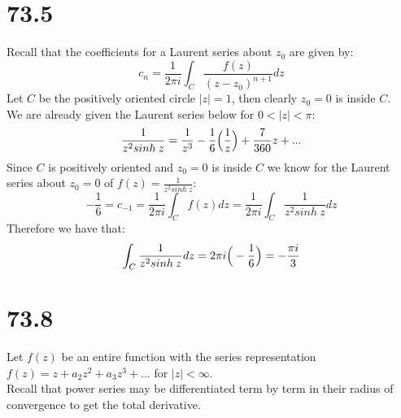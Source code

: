 \documentclass{article}
\begin{document}
\newpage
\section*{73.5}
\begin{center}
    \doublespacing
    Recall that the coefficients for a Laurent series about $z_0$ are given by:
    \[c_n =\frac{1}{2\pi i}\int _{C}\frac{f(z)}{(z - z_0)^{n+1}} dz\]
    Let $C$ be the positively oriented circle $|z| = 1$, then clearly $z_0 = 0$ is inside $C$.
    \\We are already given the Laurent series below for $0 < |z| <\pi$:
    \[\frac{1}{z^2 sinh\:z} =\frac{1}{z^3} -\frac{1}{6}\Big{(}\frac{1}{z}\Big{)} +\frac{7}{360} z + ...\]
    Since $C$ is positively oriented and $z_0 = 0$ is inside $C$ we know for the Laurent series about $z_0 = 0$ of $f(z) =\frac{1}{z^2 sinh\:z}$:
    \[-\frac{1}{6} = c_{-1} =\frac{1}{2\pi i}\int _{C} f(z) dz =\frac{1}{2\pi i}\int _{C}\frac{1}{z^2 sinh\:z} dz\]
    Therefore we have that:
    \[\int _{C}\frac{1}{z^2 sinh\:z} dz = 2\pi i\Big{(}-\frac{1}{6}\Big{)} = -\frac{\pi i}{3}\]
    \qedsymbol
\end{center}


\newpage
\section*{73.8}
\begin{center}
    \doublespacing
    Let $f(z)$ be an entire function with the series representation $f(z) = z + a_2 z^2 + a_3 z^3 + ...$ for $|z| <\infty$.
    \\Recall that power series may be differentiated term by term in their radius of convergence to get the total derivative.
\end{center}
\end{document}
